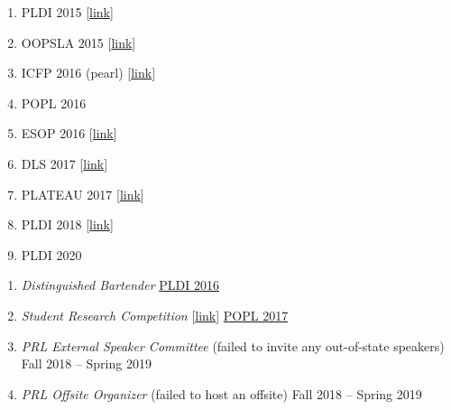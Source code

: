 \documentclass{article}
\begin{document}

\begin{enumerate}
\item PLDI 2015 [\href{http://ccs.neu.edu/home/types/cv/failures/pldi-2015-reject.pdf}{link}]
\item OOPSLA 2015 [\href{http://ccs.neu.edu/home/types/cv/failures/oopsla-2015-reject.pdf}{link}]
\item ICFP 2016 (pearl) [\href{http://ccs.neu.edu/home/types/cv/failures/icfp-2016-reject.pdf}{link}]
\item POPL 2016
\item ESOP 2016 [\href{http://ccs.neu.edu/home/types/resources/type-tailoring.pdf}{link}]
\item DLS 2017 [\href{http://ccs.neu.edu/home/types/resources/dls-2017-reject.pdf}{link}]
\item PLATEAU 2017 [\href{http://ccs.neu.edu/home/types/cv/failures/plateau-2017-reject.pdf}{link}]
\item PLDI 2018 [\href{http://ccs.neu.edu/home/types/cv/failures/pldi-2018-reject.pdf}{link}]
\item PLDI 2020
\end{enumerate}

\begin{enumerate}
\item \emph{Distinguished Bartender} \hfill \href{http://conf.researchr.org/home/PLDI-2016}{PLDI 2016}
\item \emph{Student Research Competition} [\href{http://ccs.neu/home/types/cv/failures/src-2017-reject.pdf}{link}] \hfill \href{https://popl17.sigplan.org/track/POPL-2017-src}{POPL 2017}
\item \emph{PRL External Speaker Committee} (failed to invite any out-of-state speakers)  \hfill {Fall 2018 -- Spring 2019}
\item \emph{PRL Offsite Organizer} (failed to host an offsite) \hfill {Fall 2018 -- Spring 2019}
\end{enumerate}
\end{document}
